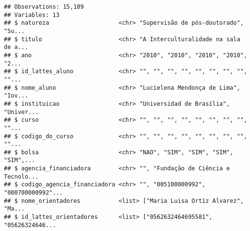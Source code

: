 \documentclass[]{article}
\newenvironment{Shaded}{\begin{snugshade}}{\end{snugshade}}
\newcommand{\KeywordTok}[1]{\textcolor[rgb]{0.13,0.29,0.53}{\textbf{#1}}}
\newcommand{\DataTypeTok}[1]{\textcolor[rgb]{0.13,0.29,0.53}{#1}}
\newcommand{\CharTok}[1]{\textcolor[rgb]{0.31,0.60,0.02}{#1}}
\newcommand{\StringTok}[1]{\textcolor[rgb]{0.31,0.60,0.02}{#1}}
\newcommand{\CommentTok}[1]{\textcolor[rgb]{0.56,0.35,0.01}{\textit{#1}}}
\newcommand{\OperatorTok}[1]{\textcolor[rgb]{0.81,0.36,0.00}{\textbf{#1}}}
\newcommand{\NormalTok}[1]{#1}
\begin{document}
\begin{verbatim}
## Observations: 15,109
## Variables: 13
## $ natureza                    <chr> "Supervisão de pós-doutorado", "Su...
## $ titulo                      <chr> "A Interculturalidade na sala de a...
## $ ano                         <chr> "2010", "2010", "2010", "2010", "2...
## $ id_lattes_aluno             <chr> "", "", "", "", "", "", "", "", ""...
## $ nome_aluno                  <chr> "Lucielena Mendonça de Lima", "Iov...
## $ instituicao                 <chr> "Universidad de Brasília", "Univer...
## $ curso                       <chr> "", "", "", "", "", "", "", "", ""...
## $ codigo_do_curso             <chr> "", "", "", "", "", "", "", "", ""...
## $ bolsa                       <chr> "NAO", "SIM", "SIM", "SIM", "SIM",...
## $ agencia_financiadora        <chr> "", "Fundação de Ciência e Tecnolo...
## $ codigo_agencia_financiadora <chr> "", "005100000992", "000700000992"...
## $ nome_orientadores           <list> ["Maria Luisa Ortíz Alvarez", "Ma...
## $ id_lattes_orientadores      <list> ["0562632464695581", "05626324646...
\end{verbatim}

\begin{Shaded}
\end{Shaded}
\end{document}
